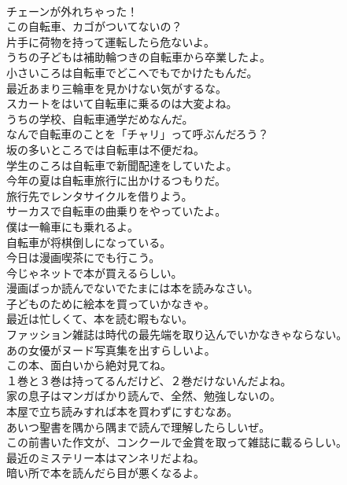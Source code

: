 \documentclass[8pt]{extreport}
\begin{document}
\begin{CJK}{UTF8}{min}
\\	チェーンが外れちゃった！	
\\	この自転車、カゴがついてないの？	
\\	片手に荷物を持って運転したら危ないよ。	
\\	うちの子どもは補助輪つきの自転車から卒業したよ。	
\\	小さいころは自転車でどこへでもでかけたもんだ。	
\\	最近あまり三輪車を見かけない気がするな。	
\\	スカートをはいて自転車に乗るのは大変よね。	
\\	うちの学校、自転車通学だめなんだ。	
\\	なんで自転車のことを「チャリ」って呼ぶんだろう？	
\\	坂の多いところでは自転車は不便だね。	
\\	学生のころは自転車で新聞配達をしていたよ。	
\\	今年の夏は自転車旅行に出かけるつもりだ。	
\\	旅行先でレンタサイクルを借りよう。	
\\	サーカスで自転車の曲乗りをやっていたよ。	
\\	僕は一輪車にも乗れるよ。	
\\	自転車が将棋倒しになっている。	
\\	今日は漫画喫茶にでも行こう。	
\\	今じゃネットで本が買えるらしい。	
\\	漫画ばっか読んでないでたまには本を読みなさい。	
\\	子どものために絵本を買っていかなきゃ。	
\\	最近は忙しくて、本を読む暇もない。	
\\	ファッション雑誌は時代の最先端を取り込んでいかなきゃならない。	
\\	あの女優がヌード写真集を出すらしいよ。	
\\	この本、面白いから絶対見てね。	
\\	１巻と３巻は持ってるんだけど、２巻だけないんだよね。	
\\	家の息子はマンガばかり読んで、全然、勉強しないの。	
\\	本屋で立ち読みすれば本を買わずにすむなあ。	
\\	あいつ聖書を隅から隅まで読んで理解したらしいぜ。	
\\	この前書いた作文が、コンクールで金賞を取って雑誌に載るらしい。	
\\	最近のミステリー本はマンネリだよね。	
\\	暗い所で本を読んだら目が悪くなるよ。	

\end{CJK}
\end{document}
